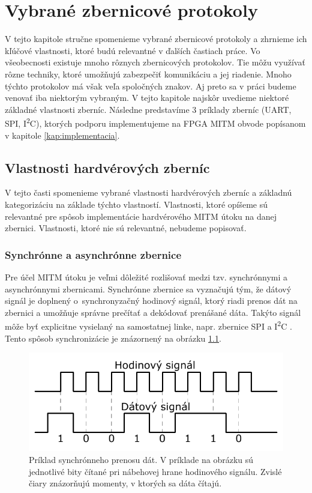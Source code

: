 \chapter{Vybrané zbernicové protokoly}
\label{kap:zbernice}

V tejto kapitole stručne spomenieme vybrané zbernicové protokoly a zhrnieme ich kľúčové vlastnosti, ktoré budú relevantné v ďalších častiach práce. Vo všeobecnosti existuje mnoho rôznych zbernicových protokolov. Tie môžu využívať rôzne techniky, ktoré umožňujú zabezpečiť komunikáciu a jej riadenie. Mnoho týchto protokolov má však veľa spoločných znakov. Aj preto sa v práci budeme venovať iba niektorým vybraným. V tejto kapitole najskôr uvedieme niektoré základné vlastnosti zberníc. Následne predstavíme 3 príklady zberníc (UART, SPI, I\textsuperscript{2}C), ktorých podporu implementujeme na FPGA MITM obvode popísanom v kapitole \ref{kap:implementacia}.

\section{Vlastnosti hardvérových zberníc}
V tejto časti spomenieme vybrané vlastnosti hardvérových zberníc a základnú kategorizáciu na základe týchto vlastností. Vlastnosti, ktoré opíšeme sú relevantné pre spôsob implementácie hardvérového MITM útoku na danej zbernici. Vlastnosti, ktoré nie sú relevantné, nebudeme popisovať.

\subsection{Synchrónne a asynchrónne zbernice}
Pre účel MITM útoku je veľmi dôležité rozlišovať medzi tzv. synchrónnymi a asynchrónnymi zbernicami. Synchrónne zbernice sa vyznačujú tým, že dátový signál je doplnený o~synchronyzačný hodinový signál, ktorý riadi prenos dát na zbernici a umožňuje správne prečítať a dekódovať prenášané dáta. Takýto signál môže byť explicitne vysielaný na samostatnej linke, napr. zbernice SPI \cite{spiBus} a I\textsuperscript{2}C \cite{i2cSpec}. Tento spôsob synchronizácie je znázornený na obrázku \ref{obr:clockDemo}.

\begin{figure}
    \centerline{\includegraphics[width=1\textwidth]{images/clockDemo.pdf}}
    \caption[Príklad synchrónneho prenosu dát]{Príklad synchrónneho prenosu dát. V príklade na obrázku sú jednotlivé bity čítané pri nábehovej hrane hodinového signálu. Zvislé čiary znázorňujú momenty, v ktorých sa dáta čítajú.}
    \label{obr:clockDemo}
\end{figure}

